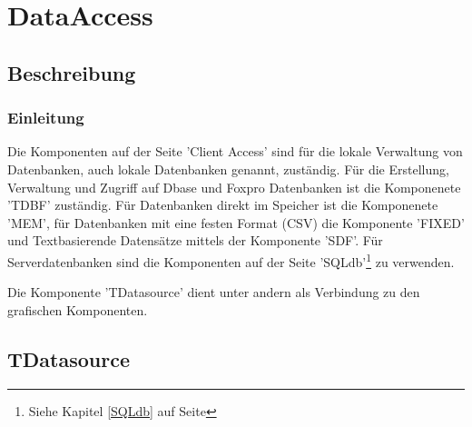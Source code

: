 \section[Data Access - Clientdatenbank Komponenten]{DataAccess}
\subsection{Beschreibung}
\subsubsection{Einleitung}
Die Komponenten auf der Seite 'Client Access' sind für die lokale\label{ClientAccess} Verwaltung von Datenbanken, auch lokale Datenbanken genannt, zuständig. 
\label{fig:LazDataAccess01} Für die Erstellung, Verwaltung und Zugriff auf Dbase und Foxpro Datenbanken ist die Komponenete 'TDBF' zuständig. Für Datenbanken direkt im Speicher ist die Komponenete 'MEM', für Datenbanken mit eine festen Format (CSV) die Komponente 'FIXED' und Textbasierende Datensätze mittels der Komponente 'SDF'.
Für Serverdatenbanken sind die Komponenten auf der Seite 'SQLdb'\footnote{Siehe Kapitel \ref{SQLdb} auf Seite \pageref{SQLdb}} zu verwenden.

Die Komponente 'TDatasource' dient unter andern als Verbindung zu den grafischen Komponenten.

\subsection{TDatasource}

